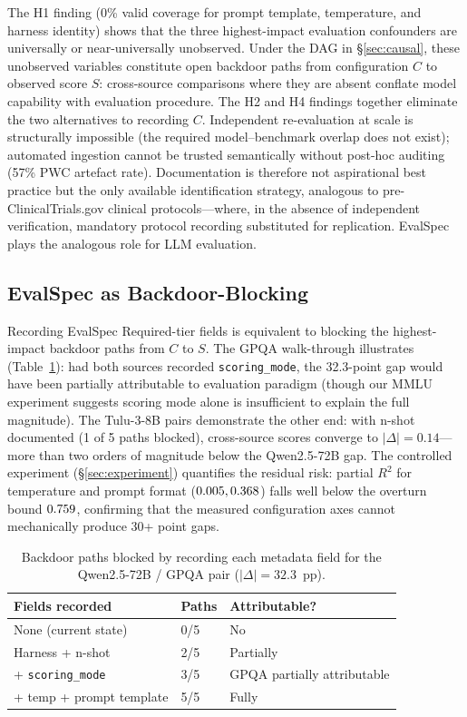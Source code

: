 \documentclass[11pt]{article}
\begin{document}
The H1 finding (0\% valid coverage for prompt template,
temperature, and harness identity) shows that the three
highest-impact evaluation confounders
\citep{alzahrani-2024-benchmarks,
biderman-2024-lessons} are universally or near-universally
unobserved. Under the DAG
in \S\ref{sec:causal}, these unobserved variables constitute
open backdoor paths from configuration $C$ to observed score
$S$: cross-source comparisons where they are absent conflate
model capability with evaluation procedure. The H2 and H4
findings together eliminate the two alternatives to recording
$C$. Independent re-evaluation at scale is structurally
impossible (the required model--benchmark overlap does not
exist); automated ingestion cannot be trusted semantically
without post-hoc auditing (57\% PWC artefact rate). Documentation
is therefore not aspirational best practice but the only
available identification strategy, analogous to
pre-ClinicalTrials.gov clinical protocols---where, in the
absence of independent verification, mandatory protocol
recording substituted for replication. EvalSpec plays the
analogous role for LLM evaluation.

\subsection{EvalSpec as Backdoor-Blocking}

Recording EvalSpec Required-tier fields is equivalent to blocking
the highest-impact backdoor paths from $C$ to $S$. The GPQA
walk-through illustrates (Table~\ref{tab:backdoor}): had both
sources recorded \texttt{scoring\_mode}, the 32.3-point gap would
have been partially attributable to evaluation paradigm (though our
MMLU experiment suggests scoring mode alone is insufficient to
explain the full magnitude). The Tulu-3-8B pairs demonstrate the other end:
with n-shot documented (1 of 5 paths blocked),
cross-source scores converge to $|\Delta| = 0.14$---more than two orders
of magnitude below the Qwen2.5-72B gap. The controlled experiment
(\S\ref{sec:experiment}) quantifies the residual risk: partial
$R^2$ for temperature and prompt format
($0.005{}, 0.368{}$) falls well below the
overturn bound $0.759{}$, confirming that the measured
configuration axes cannot mechanically produce 30+ point gaps.

\begin{table}[h]
\centering
\small
\setlength{\tabcolsep}{4pt}
\caption{Backdoor paths blocked by recording each metadata field
for the Qwen2.5-72B / GPQA pair ($|\Delta| = 32.3$~pp).}
\label{tab:backdoor}
\begin{tabular}{lll}
\toprule
\textbf{Fields recorded} & \textbf{Paths} & \textbf{Attributable?} \\
\midrule
None (current state)     & 0/5 & No \\
Harness + n-shot         & 2/5 & Partially \\
+ \texttt{scoring\_mode} & 3/5 & GPQA partially attributable \\
+ temp + prompt template & 5/5 & Fully \\
\bottomrule
\end{tabular}
\end{table}
\end{document}
